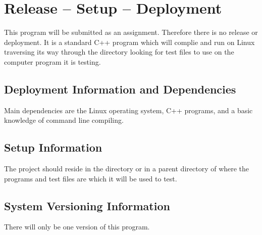 
\chapter{Release -- Setup -- Deployment}
This program will be submitted as an assignment. Therefore there is no release or deployment. It is a standard C++ program
which will complie and run on Linux traversing its way through the directory looking for test files to use on the computer program
it is testing.


\section{Deployment Information and Dependencies}
Main dependencies are the Linux operating system, C++ programs, and a basic knowledge of command line compiling. 



\section{Setup Information}
The project should reside in the directory or in a parent directory of where the programs and test files are which it will be used 
to test.



\section{System  Versioning Information}
There will only be one version of this program.
